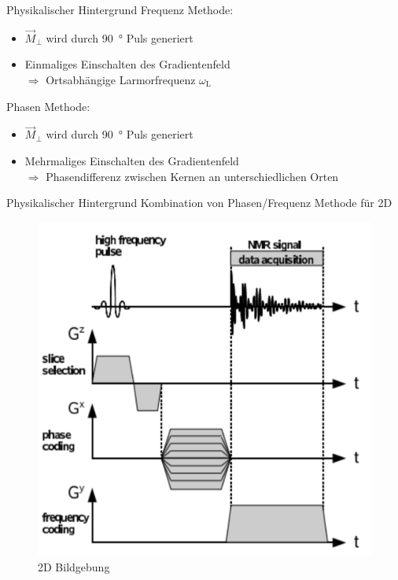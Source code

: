 \begin{frame}{Physikalischer Hintergrund}
Frequenz Methode:
	\begin{itemize}
	\item $\vec{M}_\bot$ wird durch \SI{90}{\degree} Puls generiert
	\item Einmaliges Einschalten des Gradientenfeld\\
	$\Rightarrow$ Ortsabhängige Larmorfrequenz $\omega_\text{L}$
	\end{itemize}
\vspace{.5cm}
Phasen Methode:
	\begin{itemize}
	\item $\vec{M}_\bot$ wird durch \SI{90}{\degree} Puls generiert
	\item Mehrmaliges Einschalten des Gradientenfeld\\
	$\Rightarrow$ Phasendifferenz zwischen Kernen an unterschiedlichen Orten
	\end{itemize}
\end{frame}

\begin{frame}{Physikalischer Hintergrund}
Kombination von Phasen/Frequenz Methode für 2D
	\begin{figure}
	\centering
	\includegraphics[scale=.15]{images//signal.png}
	\caption{2D Bildgebung \cite{script_nmr}}
	\end{figure}
\end{frame}

